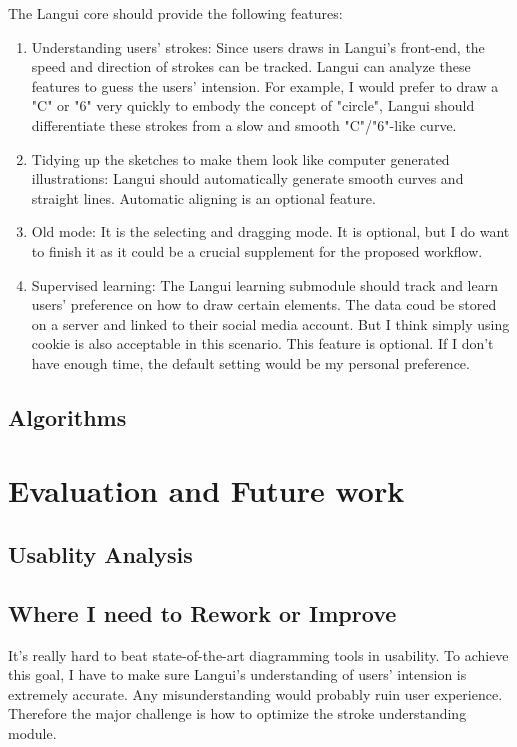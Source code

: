 \documentclass[10pt,conference, twocolumn]{IEEEtran}
\begin{document}
The Langui core should provide the following features:

\begin{enumerate}
  \item Understanding users' strokes: Since users draws in Langui's front-end, the speed and direction of strokes can be tracked. Langui can analyze these features to guess the users' intension. For example, I would prefer to draw a "C" or "6" very quickly to embody the concept of "circle", Langui should differentiate these strokes from a slow and smooth "C"/"6"-like curve.
  \item Tidying up the sketches to make them look like computer generated illustrations: Langui should automatically generate smooth curves and straight lines. Automatic aligning is an optional feature.
  \item Old mode: It is the selecting and dragging mode. It is optional, but I do want to finish it as it could be a crucial supplement for the proposed workflow.
  \item Supervised learning: The Langui learning submodule should track and learn users' preference on how to draw certain elements. The data coud be stored on a server and linked to their social media account. But I think simply using cookie is also acceptable in this scenario.  This feature is optional. If I don't have enough time, the default setting would be my personal preference.
\end{enumerate}


\subsection{Algorithms}




\section{Evaluation and Future work}
\subsection{Usablity Analysis}


\subsection{Where I need to Rework or Improve}
It's really hard to beat state-of-the-art diagramming tools in usability. To achieve this goal, I have to make sure Langui's understanding of users' intension is extremely accurate. Any misunderstanding would probably ruin user experience. Therefore the major challenge is how to optimize the stroke understanding module.
\end{document}
